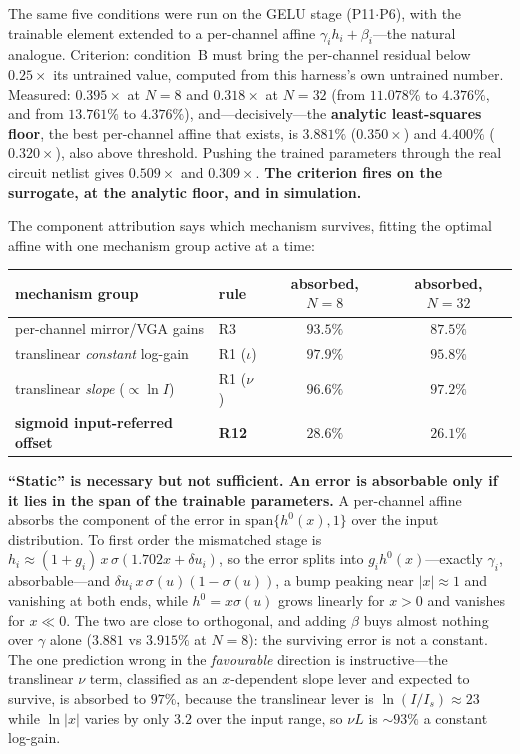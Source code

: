 \documentclass[11pt]{article}
\begin{document}
The same five conditions were run on the GELU stage (P11$\cdot$P6), with the trainable element extended to a per-channel affine $\gamma_i h_i + \beta_i$---the natural analogue. Criterion: condition~B must bring the per-channel residual below $0.25\times$ its untrained value, computed from this harness's own untrained number. Measured: $\mathbf{0.395\times}$ at $N=8$ and $\mathbf{0.318\times}$ at $N=32$ (from $11.078\%$ to $4.376\%$, and from $13.761\%$ to $4.376\%$), and---decisively---the \textbf{analytic least-squares floor}, the best per-channel affine that exists, is $3.881\%$ ($0.350\times$) and $4.400\%$ ($0.320\times$), also above threshold. Pushing the trained parameters through the real circuit netlist gives $0.509\times$ and $0.309\times$. \textbf{The criterion fires on the surrogate, at the analytic floor, and in simulation.}

The component attribution says which mechanism survives, fitting the optimal affine with one mechanism group active at a time:

\begin{center}
\footnotesize
\begin{tabular}{llcc}
\toprule
mechanism group & rule & absorbed, $N=8$ & absorbed, $N=32$ \\
\midrule
per-channel mirror/VGA gains & R3 & $93.5\%$ & $87.5\%$ \\
translinear \textit{constant} log-gain & R1 ($\iota$) & $97.9\%$ & $95.8\%$ \\
translinear \textit{slope} ($\propto \ln I$) & R1 ($\nu$) & $96.6\%$ & $97.2\%$ \\
\textbf{sigmoid input-referred offset} & \textbf{R12} & $\mathbf{28.6\%}$ & $\mathbf{26.1\%}$ \\
\bottomrule
\end{tabular}
\end{center}

\textbf{``Static'' is necessary but not sufficient. An error is absorbable only if it lies in the span of the trainable parameters.} A per-channel affine absorbs the component of the error in $\mathrm{span}\{h^0(x), 1\}$ over the input distribution. To first order the mismatched stage is $h_i \approx (1+g_i)\,x\,\sigma(1.702x + \delta u_i)$, so the error splits into $g_i h^0(x)$---exactly $\gamma_i$, absorbable---and $\delta u_i\, x\,\sigma(u)(1-\sigma(u))$, a bump peaking near $|x|\approx1$ and vanishing at both ends, while $h^0 = x\sigma(u)$ grows linearly for $x>0$ and vanishes for $x \ll 0$. The two are close to orthogonal, and adding $\beta$ buys almost nothing over $\gamma$ alone ($3.881$ vs $3.915\%$ at $N=8$): the surviving error is not a constant. The one prediction wrong in the \textit{favourable} direction is instructive---the translinear $\nu$ term, classified as an $x$-dependent slope lever and expected to survive, is absorbed to $97\%$, because the translinear lever is $\ln(I/I_s)\approx23$ while $\ln|x|$ varies by only $3.2$ over the input range, so $\nu L$ is ${\sim}93\%$ a constant log-gain.
\end{document}
